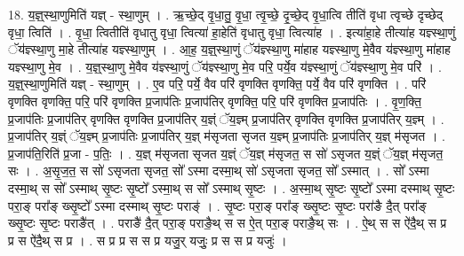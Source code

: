\documentclass[17pt]{extarticle}
\begin{document}
18. य॒ज्ञ्॒स्था॒णुमिति॑ यज्ञ् - स्था॒णुम् । . ऋ॒च्छे॒द् वृ॒धा॒तु॒ वृ॒धा॒ त्वृ॒च्छे॒ दृ॒च्छे॒द् वृ॒धा॒त्वि तीति॑ वृधा त्वृच्छे दृच्छेद् वृधा॒ त्विति॑ । . वृ॒धा॒ त्वितीति॑ वृधातु वृधा॒ त्वित्या॑ हा॒हेति॑ वृधातु वृधा॒ त्वित्या॑ह । . इत्या॑हा॒हे तीत्या॑ह यज्ञ्स्था॒णुं ॅय॑ज्ञ्स्था॒णु मा॒हे तीत्या॑ह यज्ञ्स्था॒णुम् । . आ॒ह॒ य॒ज्ञ्॒स्था॒णुं ॅय॑ज्ञ्स्था॒णु मा॑हाह यज्ञ्स्था॒णु मे॒वैव य॑ज्ञ्स्था॒णु मा॑हाह यज्ञ्स्था॒णु मे॒व । . य॒ज्ञ्॒स्था॒णु मे॒वैव य॑ज्ञ्स्था॒णुं ॅय॑ज्ञ्स्था॒णु मे॒व परि॒ पर्ये॒व य॑ज्ञ्स्था॒णुं ॅय॑ज्ञ्स्था॒णु मे॒व परि॑ । . य॒ज्ञ्॒स्था॒णुमिति॑ यज्ञ् - स्था॒णुम् । . ए॒व परि॒ पर्ये॒ वैव परि॑ वृणक्ति वृणक्ति॒ पर्ये॒ वैव परि॑ वृणक्ति । . परि॑ वृणक्ति वृणक्ति॒ परि॒ परि॑ वृणक्ति प्र॒जाप॑तिः प्र॒जाप॑तिर् वृणक्ति॒ परि॒ परि॑ वृणक्ति प्र॒जाप॑तिः । . वृ॒ण॒क्ति॒ प्र॒जाप॑तिः प्र॒जाप॑तिर् वृणक्ति वृणक्ति प्र॒जाप॑तिर् य॒ज्ञ्ं ॅय॒ज्ञ्म् प्र॒जाप॑तिर् वृणक्ति वृणक्ति प्र॒जाप॑तिर् य॒ज्ञ्म् । . प्र॒जाप॑तिर् य॒ज्ञ्ं ॅय॒ज्ञ्म् प्र॒जाप॑तिः प्र॒जाप॑तिर् य॒ज्ञ् म॑सृजता सृजत य॒ज्ञ्म् प्र॒जाप॑तिः प्र॒जाप॑तिर् य॒ज्ञ् म॑सृजत । . प्र॒जाप॑ति॒रिति॑ प्र॒जा - प॒तिः॒ । . य॒ज्ञ् म॑सृजता सृजत य॒ज्ञ्ं ॅय॒ज्ञ् म॑सृजत॒ स सो॑ ऽसृजत य॒ज्ञ्ं ॅय॒ज्ञ् म॑सृजत॒ सः । . अ॒सृ॒ज॒त॒ स सो॑ ऽसृजता सृजत॒ सो᳚ ऽस्मा दस्मा॒थ् सो॑ ऽसृजता सृजत॒ सो᳚ ऽस्मात् । . सो᳚ ऽस्मा दस्मा॒थ् स सो᳚ ऽस्माथ् सृ॒ष्टः सृ॒ष्टो᳚ ऽस्मा॒थ् स सो᳚ ऽस्माथ् सृ॒ष्टः । . अ॒स्मा॒थ् सृ॒ष्टः सृ॒ष्टो᳚ ऽस्मा दस्माथ् सृ॒ष्टः परा॒ङ् परा᳚ङ् ख्सृ॒ष्टो᳚ ऽस्मा दस्माथ् सृ॒ष्टः पराङ्॑ । . सृ॒ष्टः परा॒ङ् परा᳚ङ् ख्सृ॒ष्टः सृ॒ष्टः परा॑ङै दै॒त् परा᳚ङ् ख्सृ॒ष्टः सृ॒ष्टः पराङै॑त् । . पराङै॑ दै॒त् परा॒ङ् पराङै॒थ् स स ऐ॒त् परा॒ङ् पराङै॒थ् सः । . ऐ॒थ् स स ऐ॑दै॒थ् स प्र प्र स ऐ॑दै॒थ् स प्र । . स प्र प्र स स प्र यजु॒र् यजुः॒ प्र स स प्र यजुः॑ । \newline
\end{document}
